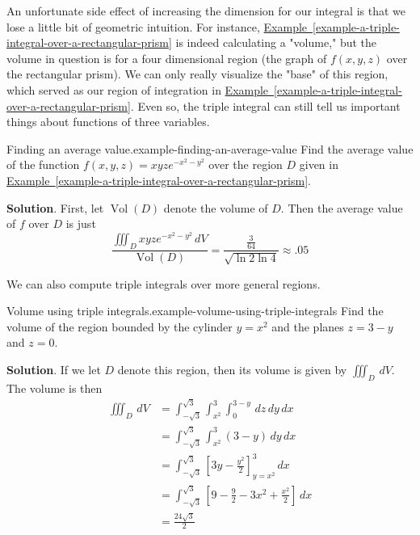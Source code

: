 \documentclass[10pt,]{book}
\numberwithin{equation}{section}
\begin{document}
\hypertarget{p-1510}{}%
An unfortunate side effect of increasing the dimension for our integral is that we lose a little bit of geometric intuition. For instance, \hyperref[example-a-triple-integral-over-a-rectangular-prism]{Example~\ref{example-a-triple-integral-over-a-rectangular-prism}} is indeed calculating a "volume," but the volume in question is for a four dimensional region (the graph of \(f(x,y,z)\) over the rectangular prism). We can only really visualize the "base" of this region, which served as our region of integration in \hyperref[example-a-triple-integral-over-a-rectangular-prism]{Example~\ref{example-a-triple-integral-over-a-rectangular-prism}}. Even so, the triple integral can still tell us important things about functions of three variables.%
\begin{example}{Finding an average value.}{example-finding-an-average-value}%
\hypertarget{p-1511}{}%
Find the average value of the function \(f(x,y,z) = xyze^{-x^{2} - y^{2}}\) over the region \(D\) given in \hyperref[example-a-triple-integral-over-a-rectangular-prism]{Example~\ref{example-a-triple-integral-over-a-rectangular-prism}}.%
\par\smallskip%
\noindent\textbf{Solution}.\hypertarget{solution-249}{}\quad%
\hypertarget{p-1512}{}%
First, let \(\operatorname{Vol}(D)\) denote the volume of \(D\). Then the average value of \(f\) over \(D\) is just%
\begin{equation*}
\frac{\iiint_{D}xyze^{-x^{2} - y^{2}}\,dV}{\operatorname{Vol}(D)} = \frac{\frac{3}{64}}{\sqrt{\ln2\ln4}} \approx .05
\end{equation*}
%
\end{example}
\hypertarget{p-1513}{}%
We can also compute triple integrals over more general regions.%
\begin{example}{Volume using triple integrals.}{example-volume-using-triple-integrals}%
\hypertarget{p-1514}{}%
Find the volume of the region bounded by the cylinder \(y = x^{2}\) and the planes \(z = 3-y\) and \(z=0\).%
\par\smallskip%
\noindent\textbf{Solution}.\hypertarget{solution-250}{}\quad%
\hypertarget{p-1515}{}%
If we let \(D\) denote this region, then its volume is given by \(\iiint_{D}\,dV\). The volume is then%
\begin{align*}
\iiint_{D}\,dV & = \int_{-\sqrt{3}}^{\sqrt{3}}\int_{x^{2}}^{3}\int_{0}^{3-y}\,dz\,dy\,dx \\
& = \int_{-\sqrt{3}}^{\sqrt{3}}\int_{x^{2}}^{3} (3-y)\,dy\,dx \\
& = \int_{-\sqrt{3}}^{\sqrt{3}}\left[3y-\frac{y^{2}}{2}\right]_{y=x^{2}}^{3}\,dx \\
& = \int_{-\sqrt{3}}^{\sqrt{3}}\left[9 - \frac{9}{2} - 3x^{2} + \frac{x^{2}}{2}\right]\,dx \\
& = \frac{24\sqrt{3}}{2} 
\end{align*}
%
\end{example}
\end{document}
